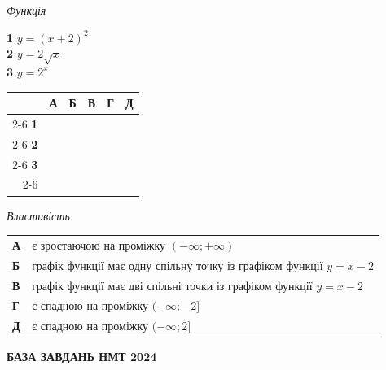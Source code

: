 \documentclass[14pt]{extarticle}
\begin{document}
\noindent
\begin{minipage}[t]{0.40\textwidth}
    \textit{Функція} \par \vspace{0.2cm}
    \textbf{1} \quad $y = (x+2)^2$ \\[0.2cm]
    \textbf{2} \quad $y = 2\sqrt{x}$ \\[0.2cm]
    \textbf{3} \quad $y = 2^x$
    
    \vspace{0.5cm}
    
    \begingroup
    \setlength{\tabcolsep}{4pt}
    \renewcommand{\arraystretch}{1.2}
    \small
    \begin{tabular}{r|c|c|c|c|c|}
         \multicolumn{1}{c}{} & \multicolumn{1}{c}{\textbf{А}} & \multicolumn{1}{c}{\textbf{Б}} & \multicolumn{1}{c}{\textbf{В}} & \multicolumn{1}{c}{\textbf{Г}} & \multicolumn{1}{c}{\textbf{Д}} \\ \cline{2-6}
         \textbf{1} & & & & & \\ \cline{2-6}
         \textbf{2} & & & & & \\ \cline{2-6}
         \textbf{3} & & & & & \\ \cline{2-6}
    \end{tabular}
    \endgroup
\end{minipage}%
\hfill
\begin{minipage}[t]{0.5\textwidth}
    \textit{Властивість} \par \vspace{0.2cm}
    \begin{tabular}{l p{8.5cm}}
    \textbf{А} & є зростаючою на проміжку $(-\infty; +\infty)$ \\
    \textbf{Б} & графік функції має одну спільну точку із графіком функції $y = x-2$ \\
    \textbf{В} & графік функції має дві спільні точки із графіком функції $y = x-2$ \\
    \textbf{Г} & є спадною на проміжку $(-\infty; -2]$ \\
    \textbf{Д} & є спадною на проміжку $(-\infty; 2]$ \\
    \end{tabular}
\end{minipage}

\vspace{0.7cm}

\begin{center}
{\Large\textbf{\color{headerblue}БАЗА ЗАВДАНЬ НМТ 2024}}
\end{center}
\end{document}
